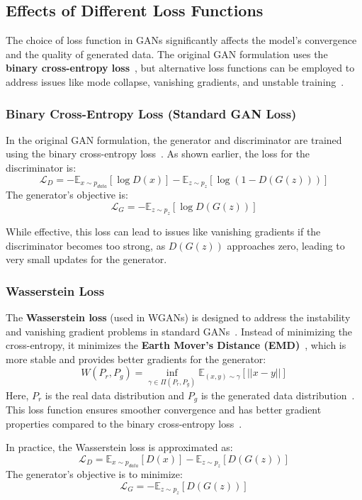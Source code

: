 \subsection{Effects of Different Loss Functions}
The choice of loss function in GANs significantly affects the model's convergence and the quality of generated data. The original GAN formulation uses the \textbf{binary cross-entropy loss}~\cite{ruby2020binary}, but alternative loss functions can be employed to address issues like mode collapse, vanishing gradients, and unstable training~\cite{ho2019real}.

\subsubsection{Binary Cross-Entropy Loss (Standard GAN Loss)}
In the original GAN formulation, the generator and discriminator are trained using the binary cross-entropy loss~\cite{ho2019real, ruby2020binary}. As shown earlier, the loss for the discriminator is:
\[
\mathcal{L}_D = - \mathbb{E}_{x \sim p_{data}}[\log D(x)] - \mathbb{E}_{z \sim p_z}[\log (1 - D(G(z)))]
\]
The generator's objective is:
\[
\mathcal{L}_G = - \mathbb{E}_{z \sim p_z}[\log D(G(z))]
\]

While effective, this loss can lead to issues like vanishing gradients if the discriminator becomes too strong, as \(D(G(z))\) approaches zero, leading to very small updates for the generator.

\subsubsection{Wasserstein Loss}
The \textbf{Wasserstein loss} (used in WGANs) is designed to address the instability and vanishing gradient problems in standard GANs~\cite{frogner2015learning}. Instead of minimizing the cross-entropy, it minimizes the \textbf{Earth Mover's Distance (EMD)}~\cite{rubner2000earth}, which is more stable and provides better gradients for the generator:
\[
W(P_r, P_g) = \inf_{\gamma \in \Pi(P_r, P_g)} \mathbb{E}_{(x, y) \sim \gamma} [|| x - y ||]
\]
Here, \(P_r\) is the real data distribution and \(P_g\) is the generated data distribution~\cite{ho2019real}. This loss function ensures smoother convergence and has better gradient properties compared to the binary cross-entropy loss~\cite{frogner2015learning}.

In practice, the Wasserstein loss is approximated as:
\[
\mathcal{L}_D = \mathbb{E}_{x \sim p_{data}}[D(x)] - \mathbb{E}_{z \sim p_z}[D(G(z))]
\]
The generator's objective is to minimize:
\[
\mathcal{L}_G = - \mathbb{E}_{z \sim p_z}[D(G(z))]
\]

